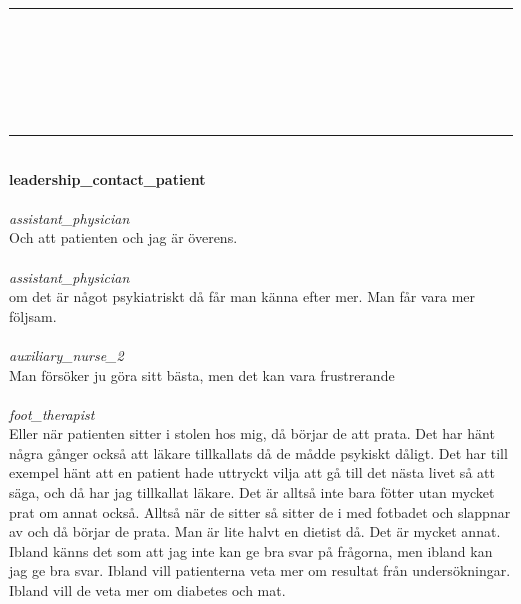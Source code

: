 \documentclass[12pt,a4paper,oneside]{article}
\begin{document}
\date{}
\maketitle
\vspace{-0.9cm}
\hrule
\ \\\ \\
{}\\
{}\\
\selectfont
\ \vspace{.66em}\\
\hrule
\ \vspace{.33em}\\
{\bf leadership\_contact\_patient }
\\\ \\%
 { \it  assistant\_physician %
}\\
Och att patienten och jag {\"a}r {\"o}verens. %
\ \\\ \\
 { \it   assistant\_physician %
}\\
om det {\"a}r n{\aa}got psykiatriskt d{\aa} f{\aa}r man k{\"a}nna efter mer. Man f{\aa}r vara mer f{\"o}ljsam. %
\ \\\ \\
 { \it   auxiliary\_nurse\_2 %
}\\
Man f{\"o}rs{\"o}ker ju g{\"o}ra sitt b{\"a}sta, men det kan vara frustrerande %
\ \\\ \\
 { \it   foot\_therapist %
}\\
Eller n{\"a}r patienten sitter i stolen hos mig, d{\aa} b{\"o}rjar de att prata. Det har h{\"a}nt n{\aa}gra g{\aa}nger ocks{\aa} att l{\"a}kare tillkallats då de mådde psykiskt d{\aa}ligt. Det har till exempel h{\"a}nt att en patient hade uttryckt vilja att g{\aa} till det n{\"a}sta livet s{\aa} att s{\"a}ga, och d{\aa} har jag tillkallat l{\"a}kare. Det {\"a}r allts{\aa} inte bara f{\"o}tter utan mycket prat om annat ocks{\aa}. Allts{\aa} n{\"a}r de sitter s{\aa} sitter de i med fotbadet och slappnar av och d{\aa} b{\"o}rjar de prata. Man {\"a}r lite halvt en dietist d{\aa}. Det {\"a}r mycket annat. Ibland k{\"a}nns det som att jag inte kan ge bra svar p{\aa} fr{\aa}gorna, men ibland kan jag ge bra svar. Ibland vill patienterna veta mer om resultat fr{\aa}n unders{\"o}kningar. Ibland vill de veta mer om diabetes och mat.  %
\end{document}
